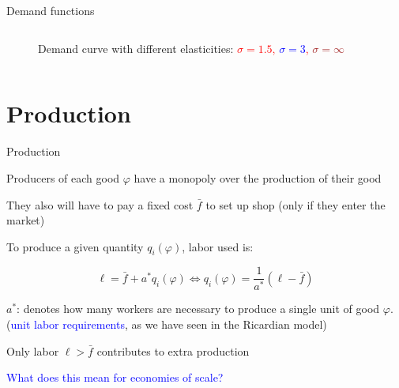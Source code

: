 \documentclass[notes,11pt, aspectratio=169, xcolor=table]{beamer}
\newcommand{\blue}[1]{\textcolor{blue}{#1}}
\newenvironment{wideitemize}{\itemize\addtolength{\itemsep}{10pt}}{\enditemize}
\begin{document}
\begin{frame}{Demand functions}
\begin{columns}
\begin{column}{0.5\textwidth}
{\begin{figure}[htp]
            \caption{Demand curve with different elasticities: \textcolor{red}{$\sigma=1.5$, \textcolor{blue}{$\sigma=3$}, \textcolor{brown}{$\sigma=\infty$}}}
        \label{fig: ces-demand}
    \end{figure}
    
        }

            \end{column}
\end{columns}
\end{frame}

\section{Production}

\begin{frame}{Production}

\begin{wideitemize}
    \item Producers of each good $\varphi$ have a monopoly over the production of their good
    \item They also will have to pay a fixed cost $\bar{f}$ to set up shop (only if they enter the market)

    \item To produce a given quantity $q_i(\varphi)$, labor used is:

    \begin{equation*}
         \ell = \bar{f} + a^*q_i(\varphi) \iff q_i(\varphi) = \frac{1}{a^*} (\ell - \bar{f})
    \end{equation*}

    \item $a^*$: denotes how many workers are necessary to produce a single unit of good $\varphi$. \\
    \qquad (\blue{unit labor requirements}, as we have seen in the Ricardian model) 

    \item Only labor $\ell > \bar{f}$ contributes to extra production
    \item \blue{What does this mean for economies of scale?}
\end{wideitemize}
    
\end{frame}
\end{document}
